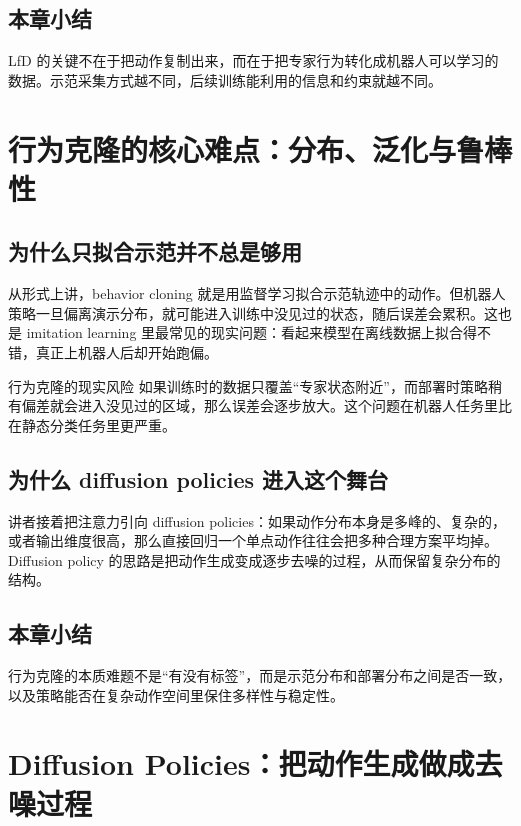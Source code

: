 \documentclass[a4paper]{article}
\begin{document}
\subsection{本章小结}

LfD 的关键不在于把动作复制出来，而在于把专家行为转化成机器人可以学习的数据。示范采集方式越不同，后续训练能利用的信息和约束就越不同。

\section{行为克隆的核心难点：分布、泛化与鲁棒性}

\subsection{为什么只拟合示范并不总是够用}

从形式上讲，behavior cloning 就是用监督学习拟合示范轨迹中的动作。但机器人策略一旦偏离演示分布，就可能进入训练中没见过的状态，随后误差会累积。这也是 imitation learning 里最常见的现实问题：看起来模型在离线数据上拟合得不错，真正上机器人后却开始跑偏。

\begin{warningbox}{行为克隆的现实风险}
如果训练时的数据只覆盖“专家状态附近”，而部署时策略稍有偏差就会进入没见过的区域，那么误差会逐步放大。这个问题在机器人任务里比在静态分类任务里更严重。
\end{warningbox}

\subsection{为什么 diffusion policies 进入这个舞台}

讲者接着把注意力引向 diffusion policies：如果动作分布本身是多峰的、复杂的，或者输出维度很高，那么直接回归一个单点动作往往会把多种合理方案平均掉。Diffusion policy 的思路是把动作生成变成逐步去噪的过程，从而保留复杂分布的结构。

\subsection{本章小结}

行为克隆的本质难题不是“有没有标签”，而是示范分布和部署分布之间是否一致，以及策略能否在复杂动作空间里保住多样性与稳定性。

\section{Diffusion Policies：把动作生成做成去噪过程}
\end{document}
